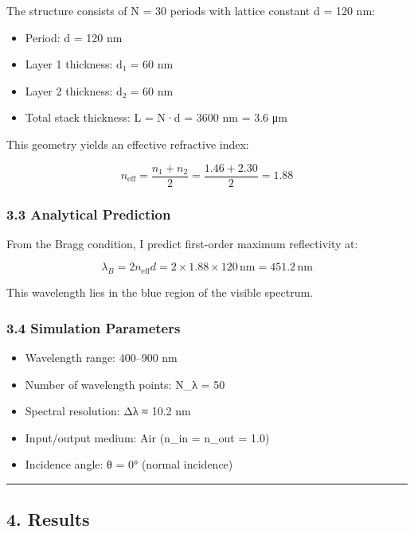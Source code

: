 \documentclass[
]{article}
\providecommand{\tightlist}{%
  \setlength{\itemsep}{0pt}\setlength{\parskip}{0pt}}
\begin{document}
The structure consists of N = 30 periods with lattice constant d = 120
nm:

\begin{itemize}
\tightlist
\item
  Period: d = 120 nm
\item
  Layer 1 thickness: d₁ = 60 nm
\item
  Layer 2 thickness: d₂ = 60 nm
\item
  Total stack thickness: L = N·d = 3600 nm = 3.6 μm
\end{itemize}

This geometry yields an effective refractive index:

\[n_{\text{eff}} = \frac{n_1 + n_2}{2} = \frac{1.46 + 2.30}{2} = 1.88\]

\subsubsection{3.3 Analytical Prediction}\label{analytical-prediction}

From the Bragg condition, I predict first-order maximum reflectivity at:

\[\lambda_B = 2n_{\text{eff}}d = 2 \times 1.88 \times 120\,\text{nm} = 451.2\,\text{nm}\]

This wavelength lies in the blue region of the visible spectrum.

\subsubsection{3.4 Simulation Parameters}\label{simulation-parameters}

\begin{itemize}
\tightlist
\item
  Wavelength range: 400--900 nm
\item
  Number of wavelength points: N\_λ = 50
\item
  Spectral resolution: Δλ ≈ 10.2 nm
\item
  Input/output medium: Air (n\_in = n\_out = 1.0)
\item
  Incidence angle: θ = 0° (normal incidence)
\end{itemize}

\begin{center}\rule{0.5\linewidth}{0.5pt}\end{center}

\subsection{4. Results}\label{results}
\end{document}
